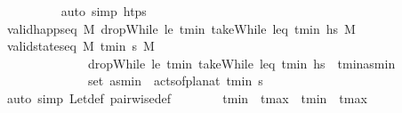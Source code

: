 \begin{isabellebody}
\ \ \ \ \ \ \ \ \isamarkupfalse%
\ {\isacharparenleft}{\kern0pt}auto\ simp{\isacharcolon}{\kern0pt}\ {\isacartoucheopen}htps\ {\isasymnoteq}\ {\isacharbrackleft}{\kern0pt}{\isacharbrackright}{\kern0pt}{\isacartoucheclose}{\isacharparenright}{\kern0pt}\isanewline
\ \ \ \ \ \ \isamarkupfalse%
\ \isamarkupfalse%
\ {\isachardoublequoteopen}valid{\isacharunderscore}{\kern0pt}happ{\isacharunderscore}{\kern0pt}seq\ M\ {\isacharparenleft}{\kern0pt}dropWhile\ {\isacharparenleft}{\kern0pt}le\ t\isactrlsub m\isactrlsub i\isactrlsub n{\isacharparenright}{\kern0pt}\ {\isacharparenleft}{\kern0pt}takeWhile\ {\isacharparenleft}{\kern0pt}leq\ t\isactrlsub m\isactrlsub i\isactrlsub n{\isacharparenright}{\kern0pt}\ hs{\isacharparenright}{\kern0pt}{\isacharparenright}{\kern0pt}\ M\isanewline
\ \ \ \ \ \ \ \ \isamarkupfalse%
\ {\isacartoucheopen}valid{\isacharunderscore}{\kern0pt}state{\isacharunderscore}{\kern0pt}seq\ M\ {\isacharbrackleft}{\kern0pt}t\isactrlsub m\isactrlsub i\isactrlsub n{\isacharbrackright}{\kern0pt}\ {\isasympi}s\ M\ \isanewline
\ \ \ \ \ \ \ \ \ \ \ \ \ \ {\isacartoucheopen}dropWhile\ {\isacharparenleft}{\kern0pt}le\ t\isactrlsub m\isactrlsub i\isactrlsub n{\isacharparenright}{\kern0pt}\ {\isacharparenleft}{\kern0pt}takeWhile\ {\isacharparenleft}{\kern0pt}leq\ t\isactrlsub m\isactrlsub i\isactrlsub n{\isacharparenright}{\kern0pt}\ hs{\isacharparenright}{\kern0pt}\ {\isacharequal}{\kern0pt}\ {\isacharbrackleft}{\kern0pt}{\isacharparenleft}{\kern0pt}t\isactrlsub m\isactrlsub i\isactrlsub n{\isacharcomma}{\kern0pt}as\isactrlsub m\isactrlsub i\isactrlsub n{\isacharparenright}{\kern0pt}{\isacharbrackright}{\kern0pt}{\isacartoucheclose}\ \isanewline
\ \ \ \ \ \ \ \ \ \ \ \ \ \ {\isacartoucheopen}set\ as\isactrlsub m\isactrlsub i\isactrlsub n\ {\isacharequal}{\kern0pt}\ acts{\isacharunderscore}{\kern0pt}of{\isacharunderscore}{\kern0pt}plan{\isacharunderscore}{\kern0pt}at\ t\isactrlsub m\isactrlsub i\isactrlsub n\ {\isasympi}s{\isacartoucheclose}\isanewline
\ \ \ \ \ \ \ \ \isamarkupfalse%
\ {\isacharparenleft}{\kern0pt}auto\ simp{\isacharcolon}{\kern0pt}\ Let{\isacharunderscore}{\kern0pt}def\ pairwise{\isacharunderscore}{\kern0pt}def{\isacharparenright}{\kern0pt}\isanewline
\isanewline
\ \ \ \ \ \ \isamarkupfalse%
\ {\isachardoublequoteopen}t\isactrlsub m\isactrlsub i\isactrlsub n\ {\isacharequal}{\kern0pt}\ t\isactrlsub m\isactrlsub a\isactrlsub x\ {\isasymor}\ t\isactrlsub m\isactrlsub i\isactrlsub n\ {\isacharless}{\kern0pt}\ t\isactrlsub m\isactrlsub a\isactrlsub x{\isachardoublequoteclose}\isanewline

\end{isabellebody}

